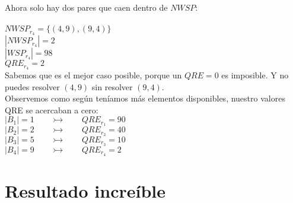 	\noindent
	Ahora solo hay dos pares que caen dentro de $NWSP$: \\\\
	$NWSP_{r_{4}}=\{ (4,9), (9,4) \}$\\
	$|NWSP_{r_{4}}| = 2$\\
	$|WSP_{r_{4}}| = 98$\\
	$QRE_{r_{4}}=2$
	\\
	
	\noindent
	Sabemos que es el mejor caso posible, porque un $QRE=0$ es imposible. Y no puedes resolver $(4,9)$ sin resolver $(9,4)$.
	\\
	
	\noindent
	Observemos como según teníamos más elementos disponibles, nuestro valores QRE se acercaban a cero:\\
	$ |B_{1}| = 1 \:\:\:\:\:\:\:\:\: \rightarrowtail \:\:\:\:\:\:\:\:\: QRE_{r_{1}} = 90$\\
	$ |B_{2}| = 2 \:\:\:\:\:\:\:\:\: \rightarrowtail \:\:\:\:\:\:\:\:\: QRE_{r_{2}} = 40$\\
	$ |B_{3}| = 5 \:\:\:\:\:\:\:\:\: \rightarrowtail \:\:\:\:\:\:\:\:\: QRE_{r_{3}} = 10$\\
	$ |B_{4}| = 9 \:\:\:\:\:\:\:\:\: \rightarrowtail \:\:\:\:\:\:\:\:\: QRE_{r_{4}} = 2$\\
	
	\newpage
	
	
	
	\section{Resultado increíble}